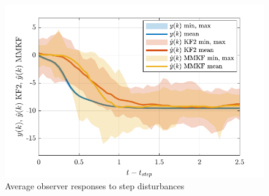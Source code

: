 \begin{figure}[htp]
	\centering
	\includegraphics[width=12cm]{images/sim_resp_plot1_P2DcTd4.pdf}
	\caption{Average observer responses to step disturbances}
	\label{fig:sim_resp_plot}
\end{figure}

